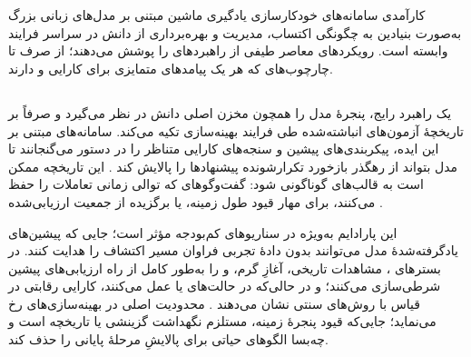 \section[تحلیل منابع دانش]{}


کارآمدی سامانه‌های خودکارسازی یادگیری ماشین مبتنی بر مدل‌های زبانی بزرگ به‌صورت بنیادین به چگونگی اکتساب، مدیریت و بهره‌برداری از دانش در سراسر فرایند  وابسته است. رویکردهای معاصر طیفی از راهبردهای  را پوشش می‌دهند؛ از  صرف تا چارچوب‌های  که هر یک پیامدهای متمایزی برای کارایی  و  دارند.
\subsection[یادگیری درون‌متنی از تاریخچهٔ بهینه‌سازی]{}

یک راهبرد رایج، پنجرهٔ  مدل را همچون مخزن اصلی دانش در نظر می‌گیرد و صرفاً بر تاریخچهٔ آزمون‌های انباشته‌شده طی فرایند بهینه‌سازی تکیه می‌کند. سامانه‌های مبتنی بر این ایده، پیکربندی‌های پیشین و سنجه‌های کارایی متناظر را در دستور می‌گنجانند تا مدل بتواند از رهگذر بازخورد تکرارشونده پیشنهادها را پالایش کند \cite{zhang2023usingLLMforHPO, zheng2023GENIUS, liu2024LLAMBO}. این تاریخچه ممکن است به قالب‌های گوناگونی  شود: گفت‌وگوهای  که توالی زمانی تعاملات را حفظ می‌کنند،  برای مهار قیود طول زمینه، یا  برگزیده از جمعیت ارزیابی‌شده \cite{zhang2023usingLLMforHPO, chen2023Evoprompting}.

این پارادایم به‌ویژه در سناریوهای کم‌بودجه مؤثر است؛ جایی که پیشین‌های یادگرفته‌شدهٔ مدل می‌توانند بدون دادهٔ تجربی فراوان مسیر اکتشاف را هدایت کنند. در بسترهای ، مشاهدات تاریخی، آغازِ گرم،  و  را به‌طور کامل از راه  ارزیابی‌های پیشین شرطی‌سازی می‌کنند؛ و در حالی‌که در حالت‌های  یا  عمل می‌کنند، کارایی رقابتی در قیاس با روش‌های سنتی نشان می‌دهند \cite{liu2024LLAMBO}. محدودیت اصلی در بهینه‌سازی‌های  رخ می‌نماید؛ جایی‌که قیود پنجرهٔ زمینه، مستلزم نگهداشت گزینشی یا  تاریخچه است و چه‌بسا الگوهای حیاتی برای پالایشِ مرحلهٔ پایانی را حذف کند.

